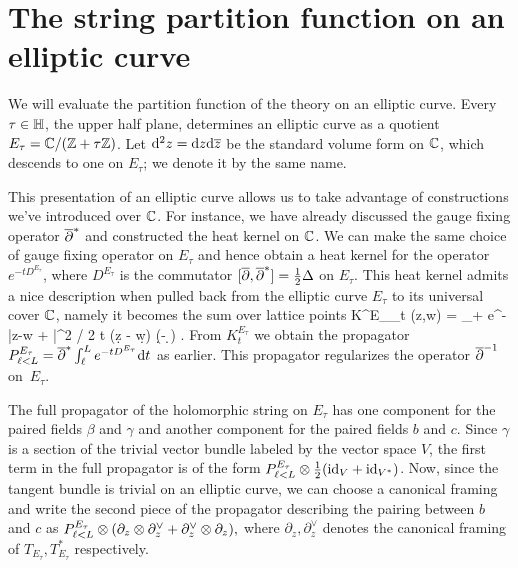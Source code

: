\section{The string partition function on an elliptic curve}

We will evaluate the partition function of the theory on an elliptic curve. 
Every $\tau \in \mathbb H$, the upper half plane, 
determines an elliptic curve as a quotient $E_\tau = \mathbb C / (\mathbb Z + \tau \mathbb Z)$.
Let ${\rm d}^2 z = {\rm d} z {\rm d} \overline{z}$ be the standard volume form on $\mathbb C$, 
which descends to one on $E_\tau$; 
we denote it by the same name. 

This presentation of an elliptic curve allows us to take advantage of constructions we've introduced over $\mathbb C$.
For instance, we have already discussed the gauge fixing operator $\overline{\partial}^*$ and constructed the heat kernel on $\mathbb C$. 
We can make the same choice of gauge fixing operator on $E_\tau$ and hence obtain a heat kernel for the operator $e^{-t D^{E_\tau}}$, 
where $D^{E_\tau}$ is the commutator $[\overline{\partial}, \overline{\partial}^*] = \frac{1}{2} \Delta$ on $E_\tau$. 
This heat kernel admits a nice description when pulled back from the elliptic curve $E_\tau$ to its universal cover $\mathbb C$,
namely it becomes the sum over lattice points
\ben 
K^{E_\tau}_t (z,w) = \sum_{\lambda \in \ZZ + \tau \ZZ}  e^{-|z-w + \lambda|^2 / 2 t} (\d z - \d w) (\d \zbar - \d \wbar ) .
\een
From $K_t^{E_\tau}$ we obtain the propagator $P_{\ell < L}^{E_\tau} = \overline{\partial}^* \int_{\ell}^L e^{-t D^{E_\tau}} {\rm d} t$ as earlier. This propagator regularizes the operator $\overline{\partial}^{-1}$ on~$E_\tau$. 

The full propagator of the holomorphic string on $E_\tau$ has one component for the paired fields $\beta$ and $\gamma$ and another component for the paired fields $b$ and $c$. 
Since $\gamma$ is a section of the trivial vector bundle labeled by the vector space $V$, 
the first term in the full propagator is of the form $P_{\ell < L}^{E_\tau} \otimes \frac{1}{2} ({\rm id}_V + {\rm id}_{V^*})$.
Now, since the tangent bundle is trivial on an elliptic curve, 
we can choose a canonical framing and write the second piece of the propagator 
describing the pairing between $b$ and $c$ as 
$P_{\ell < L}^{E_\tau} \otimes (\partial_z \otimes \partial_z^\vee + \partial_z^\vee \otimes \partial_z),$ 
where $\partial_z, \partial_z^\vee$ denotes the canonical framing of $T_{E_\tau}, T_{E_\tau}^*$ respectively. 

